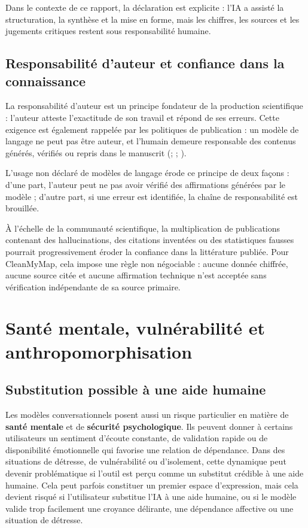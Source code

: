 \documentclass[
  10pt,
  a4paper,
  DIV=11,
  numbers=noendperiod,
  oneside]{scrreprt}
\let\oldtextbf\textbf
\renewcommand{\textbf}[1]{\oldtextbf{\textcolor{cmmnavy}{#1}}}
\begin{document}
Dans le contexte de ce rapport, la déclaration est explicite : l'IA a
assisté la structuration, la synthèse et la mise en forme, mais les
chiffres, les sources et les jugements critiques restent sous
responsabilité humaine.

\subsection{Responsabilité d'auteur et confiance dans la
connaissance}\label{responsabilituxe9-dauteur-et-confiance-dans-la-connaissance}

La responsabilité d'auteur est un principe fondateur de la production
scientifique : l'auteur atteste l'exactitude de son travail et répond de
ses erreurs. Cette exigence est également rappelée par les politiques de
publication : un modèle de langage ne peut pas être auteur, et l'humain
demeure responsable des contenus générés, vérifiés ou repris dans le
manuscrit (;
;
).

L'usage non déclaré de modèles de langage érode ce principe de deux
façons : d'une part, l'auteur peut ne pas avoir vérifié des affirmations
générées par le modèle ; d'autre part, si une erreur est identifiée, la
chaîne de responsabilité est brouillée.

À l'échelle de la communauté scientifique, la multiplication de
publications contenant des hallucinations, des citations inventées ou
des statistiques fausses pourrait progressivement éroder la confiance
dans la littérature publiée. Pour CleanMyMap, cela impose une règle non
négociable : aucune donnée chiffrée, aucune source citée et aucune
affirmation technique n'est acceptée sans vérification indépendante de
sa source primaire.

\section{Santé mentale, vulnérabilité et
anthropomorphisation}\label{santuxe9-mentale-vulnuxe9rabilituxe9-et-anthropomorphisation}

\subsection{Substitution possible à une aide
humaine}\label{substitution-possible-uxe0-une-aide-humaine}

Les modèles conversationnels posent aussi un risque particulier en
matière de \textbf{santé mentale} et de \textbf{sécurité psychologique}.
Ils peuvent donner à certains utilisateurs un sentiment d'écoute
constante, de validation rapide ou de disponibilité émotionnelle qui
favorise une relation de dépendance. Dans des situations de détresse, de
vulnérabilité ou d'isolement, cette dynamique peut devenir problématique
si l'outil est perçu comme un substitut crédible à une aide humaine.
Cela peut parfois constituer un premier espace d'expression, mais cela
devient risqué si l'utilisateur substitue l'IA à une aide humaine, ou si
le modèle valide trop facilement une croyance délirante, une dépendance
affective ou une situation de détresse.
\end{document}
